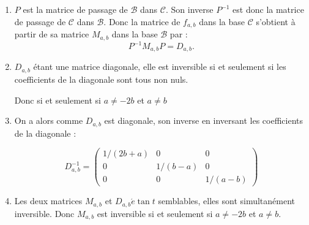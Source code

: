 \begin{correction}
\begin{enumerate}
\begin{enumerate}
\item $P$ est la matrice de passage de $\mathcal{B}$ dans $\mathcal{C}.$ Son
inverse $P^{-1}$ est donc la matrice de passage de $\mathcal{C}$ dans $%
\mathcal{B}.$ Donc la matrice de $f_{a,b}$ dans la base $\mathcal{C}$
s'obtient \`{a} partir de sa matrice $M_{a,b}$ dans la base $\mathcal{B}$
par : 
\begin{equation*}
P^{-1}M_{a,b}P=D_{a,b}.
\end{equation*}

\item $D_{a,b}$ \'{e}tant une matrice diagonale, elle est inversible si et
seulement si les coefficients de la diagonale sont tous non nuls.

Donc si et seulement si $a\neq -2b$ et $a\neq b$

\item On a alors comme $D_{a,b}$ est diagonale, son inverse en inversant les
coefficients de la diagonale :

\begin{equation*}
D_{a,b}^{-1}=\left( 
\begin{array}{ccc}
1/\left( 2b+a\right) & 0 & 0 \\ 
0 & 1/\left( b-a\right) & 0 \\ 
0 & 0 & 1/\left( a-b\right)%
\end{array}%
\right)
\end{equation*}

\item Les deux matrices $M_{a,b}$ et $D_{a,b}\acute{e}\tan t$ semblables,
elles sont simultan\'{e}ment inversible. Donc $M_{a,b}$ est inversible si et
seulement si $a\neq -2b$ et $a\neq b.$
\end{enumerate}


\end{enumerate}

\end{correction} 















